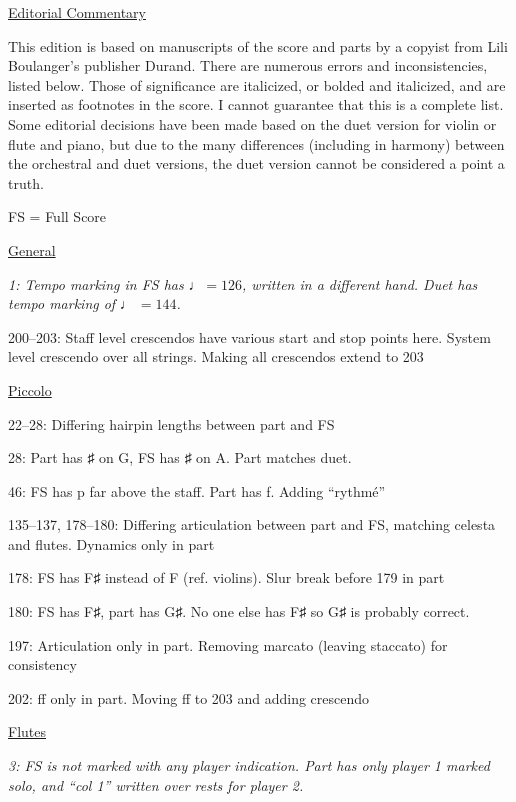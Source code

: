 \documentclass[twoside]{article}
\begin{document}
\begin{center}
\underline{\huge{Editorial Commentary}}
\end{center}

This edition is based on manuscripts of the score and parts by a copyist from Lili Boulanger's publisher Durand. There are numerous errors and inconsistencies, listed below. Those of significance are italicized, or bolded and italicized, and are inserted as footnotes in the score. I cannot guarantee that this is a complete list. Some editorial decisions have been made based on the duet version for violin or flute and piano, but due to the many differences (including in harmony) between the orchestral and duet versions, the duet version cannot be considered a point a truth.

\begin{hangparas}{15pt}{1}
\bigbreak
FS = Full Score
\begin{multicols}{2}

\underline{General}

\textit{1: Tempo marking in FS has }$\quarternote=126$\textit{, written in a different hand. Duet has tempo marking of }$\quarternote\ =144$\textit{.}

200--203: Staff level crescendos have various start and stop points here. System level crescendo over all strings. Making all crescendos extend to 203

\underline{Piccolo}

22--28: Differing hairpin lengths between part and FS

28: Part has ♯ on G, FS has ♯ on A. Part matches duet.

46: FS has p far above the staff. Part has f. Adding ``rythmé''

135--137, 178--180: Differing articulation between part and FS, matching celesta and flutes. Dynamics only in part

178: FS has F♯ instead of F (ref. violins). Slur break before 179 in part

180: FS has F♯, part has G♯. No one else has F♯ so G♯ is probably correct.

197: Articulation only in part. Removing marcato (leaving staccato) for consistency

202: ff only in part. Moving ff to 203 and adding crescendo

\underline{Flutes}

\textit{3: FS is not marked with any player indication. Part has only player 1 marked solo, and ``col 1'' written over rests for player 2.}


\end{multicols}
\end{hangparas}
\end{document}
